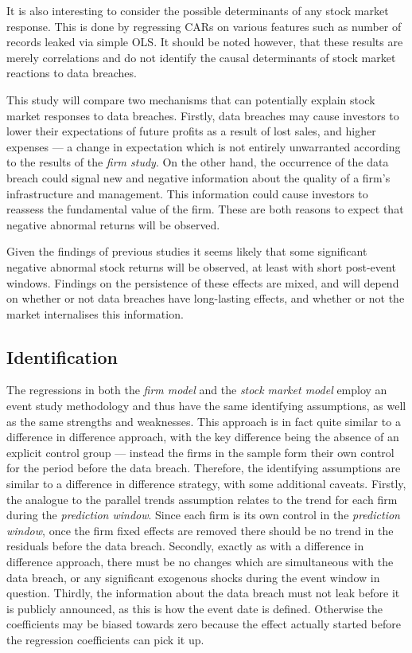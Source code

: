 \documentclass[../Main.tex]{subfiles}
\begin{document}
It is also interesting to consider the possible determinants of any stock market response. This is done by regressing CARs on various features such as number of records leaked via simple OLS. It should be noted however, that these results are merely correlations and do not identify the causal determinants of stock market reactions to data breaches.

This study will compare two mechanisms that can potentially explain stock market responses to data breaches. Firstly, data breaches may cause investors to lower their expectations of future profits as a result of lost sales, and higher expenses --- a change in expectation which is not entirely unwarranted according to the results of the \textit{firm study}. On the other hand, the occurrence of the data breach could signal new and negative information about the quality of a firm's infrastructure and management. This information could cause investors to reassess the fundamental value of the firm. These are both reasons to expect that negative abnormal returns will be observed. 

Given the findings of previous studies \citep{goel2009, morse2011, acquisti2006} it seems likely that some significant negative abnormal stock returns will be observed, at least with short post-event windows. Findings on the persistence of these effects are mixed, and will depend on whether or not data breaches have long-lasting effects, and whether or not the market internalises this information. 

\subsection{Identification}

The regressions in both the \textit{firm model} and the \textit{stock market model} employ an event study methodology and thus have the same identifying assumptions, as well as the same strengths and weaknesses. This approach is in fact quite similar to a difference in difference approach, with the key difference being the absence of an explicit control group --- instead the firms in the sample form their own control for the period before the data breach. Therefore, the identifying assumptions are similar to a difference in difference strategy, with some additional caveats. Firstly, the analogue to the parallel trends assumption relates to the trend for each firm during the \textit{prediction window}. Since each firm is its own control in the \textit{prediction window}, once the firm fixed effects are removed there should be no trend in the residuals before the data breach. Secondly, exactly as with a difference in difference approach, there must be no changes which are simultaneous with the data breach, or any significant exogenous shocks during the event window in question. Thirdly, the information about the data breach must not leak before it is publicly announced, as this is how the event date is defined. Otherwise the coefficients may be biased towards zero because the effect actually started before the regression coefficients can pick it up. 
\end{document}
